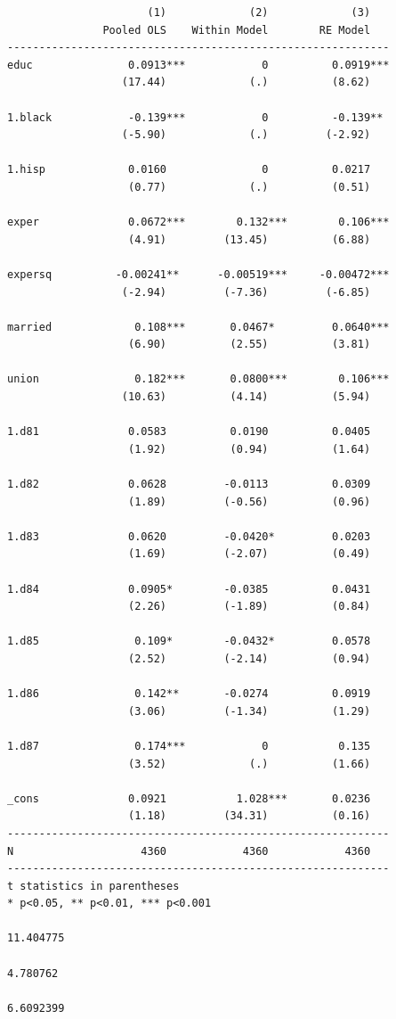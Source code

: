 \documentclass[
]{book}
\begin{document}
\begin{verbatim}
                      (1)             (2)             (3)   
               Pooled OLS    Within Model        RE Model   
------------------------------------------------------------
educ               0.0913***            0          0.0919***
                  (17.44)             (.)          (8.62)   

1.black            -0.139***            0          -0.139** 
                  (-5.90)             (.)         (-2.92)   

1.hisp             0.0160               0          0.0217   
                   (0.77)             (.)          (0.51)   

exper              0.0672***        0.132***        0.106***
                   (4.91)         (13.45)          (6.88)   

expersq          -0.00241**      -0.00519***     -0.00472***
                  (-2.94)         (-7.36)         (-6.85)   

married             0.108***       0.0467*         0.0640***
                   (6.90)          (2.55)          (3.81)   

union               0.182***       0.0800***        0.106***
                  (10.63)          (4.14)          (5.94)   

1.d81              0.0583          0.0190          0.0405   
                   (1.92)          (0.94)          (1.64)   

1.d82              0.0628         -0.0113          0.0309   
                   (1.89)         (-0.56)          (0.96)   

1.d83              0.0620         -0.0420*         0.0203   
                   (1.69)         (-2.07)          (0.49)   

1.d84              0.0905*        -0.0385          0.0431   
                   (2.26)         (-1.89)          (0.84)   

1.d85               0.109*        -0.0432*         0.0578   
                   (2.52)         (-2.14)          (0.94)   

1.d86               0.142**       -0.0274          0.0919   
                   (3.06)         (-1.34)          (1.29)   

1.d87               0.174***            0           0.135   
                   (3.52)             (.)          (1.66)   

_cons              0.0921           1.028***       0.0236   
                   (1.18)         (34.31)          (0.16)   
------------------------------------------------------------
N                    4360            4360            4360   
------------------------------------------------------------
t statistics in parentheses
* p<0.05, ** p<0.01, *** p<0.001

11.404775

4.780762

6.6092399
\end{verbatim}
\end{document}
